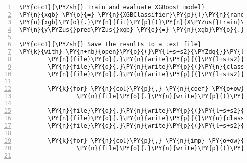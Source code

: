 \documentclass[12pt]{article}
\begin{document}
\begin{Verbatim}[commandchars=\\\{\},numbers=left,firstnumber=1,stepnumber=1,formatcom=\footnotesize]
\PY{c+c1}{\PYZsh{} Train and evaluate XGBoost model}
\PY{n}{xgb} \PY{o}{=} \PY{n}{XGBClassifier}\PY{p}{(}\PY{n}{random\PYZus{}state}\PY{o}{=}\PY{l+m+mi}{42}\PY{p}{,} \PY{n}{n\PYZus{}jobs}\PY{o}{=}\PY{o}{\PYZhy{}}\PY{l+m+mi}{1}\PY{p}{)}
\PY{n}{xgb}\PY{o}{.}\PY{n}{fit}\PY{p}{(}\PY{n}{X\PYZus{}train}\PY{p}{,} \PY{n}{y\PYZus{}train}\PY{p}{)}
\PY{n}{y\PYZus{}pred\PYZus{}xgb} \PY{o}{=} \PY{n}{xgb}\PY{o}{.}\PY{n}{predict}\PY{p}{(}\PY{n}{X\PYZus{}test}\PY{p}{)}

\PY{c+c1}{\PYZsh{} Save the results to a text file}
\PY{k}{with} \PY{n+nb}{open}\PY{p}{(}\PY{l+s+s2}{\PYZdq{}}\PY{l+s+s2}{results.txt}\PY{l+s+s2}{\PYZdq{}}\PY{p}{,} \PY{l+s+s2}{\PYZdq{}}\PY{l+s+s2}{w}\PY{l+s+s2}{\PYZdq{}}\PY{p}{)} \PY{k}{as} \PY{n}{file}\PY{p}{:}
        \PY{n}{file}\PY{o}{.}\PY{n}{write}\PY{p}{(}\PY{l+s+s2}{\PYZdq{}}\PY{l+s+s2}{Results of Logistic Regression model:}\PY{l+s+se}{\PYZbs{}n}\PY{l+s+s2}{\PYZdq{}}\PY{p}{)}
        \PY{n}{file}\PY{o}{.}\PY{n}{write}\PY{p}{(}\PY{n}{classification\PYZus{}report}\PY{p}{(}\PY{n}{y\PYZus{}test}\PY{p}{,} \PY{n}{y\PYZus{}pred\PYZus{}lr}\PY{p}{)}\PY{p}{)}
        \PY{n}{file}\PY{o}{.}\PY{n}{write}\PY{p}{(}\PY{l+s+s2}{\PYZdq{}}\PY{l+s+se}{\PYZbs{}n}\PY{l+s+s2}{Feature Importances (Logistic Regression):}\PY{l+s+se}{\PYZbs{}n}\PY{l+s+s2}{\PYZdq{}}\PY{p}{)}
    
        \PY{k}{for} \PY{n}{col}\PY{p}{,} \PY{n}{coef} \PY{o+ow}{in} \PY{n+nb}{zip}\PY{p}{(}\PY{n}{X}\PY{o}{.}\PY{n}{columns}\PY{p}{,} \PY{n}{lr}\PY{o}{.}\PY{n}{coef\PYZus{}}\PY{p}{[}\PY{l+m+mi}{0}\PY{p}{]}\PY{p}{)}\PY{p}{:}
                \PY{n}{file}\PY{o}{.}\PY{n}{write}\PY{p}{(}\PY{l+s+sa}{f}\PY{l+s+s2}{\PYZdq{}}\PY{l+s+si}{\PYZob{}}\PY{n}{col}\PY{l+s+si}{\PYZcb{}}\PY{l+s+s2}{: }\PY{l+s+si}{\PYZob{}}\PY{n}{coef}\PY{l+s+si}{\PYZcb{}}\PY{l+s+se}{\PYZbs{}n}\PY{l+s+s2}{\PYZdq{}}\PY{p}{)}
    
        \PY{n}{file}\PY{o}{.}\PY{n}{write}\PY{p}{(}\PY{l+s+s2}{\PYZdq{}}\PY{l+s+se}{\PYZbs{}n}\PY{l+s+s2}{Results of Random Forest model:}\PY{l+s+se}{\PYZbs{}n}\PY{l+s+s2}{\PYZdq{}}\PY{p}{)}
        \PY{n}{file}\PY{o}{.}\PY{n}{write}\PY{p}{(}\PY{n}{classification\PYZus{}report}\PY{p}{(}\PY{n}{y\PYZus{}test}\PY{p}{,} \PY{n}{y\PYZus{}pred\PYZus{}rf}\PY{p}{)}\PY{p}{)}
        \PY{n}{file}\PY{o}{.}\PY{n}{write}\PY{p}{(}\PY{l+s+s2}{\PYZdq{}}\PY{l+s+se}{\PYZbs{}n}\PY{l+s+s2}{Feature Importances (Random Forest):}\PY{l+s+se}{\PYZbs{}n}\PY{l+s+s2}{\PYZdq{}}\PY{p}{)}
    
        \PY{k}{for} \PY{n}{col}\PY{p}{,} \PY{n}{imp} \PY{o+ow}{in} \PY{n+nb}{zip}\PY{p}{(}\PY{n}{X}\PY{o}{.}\PY{n}{columns}\PY{p}{,} \PY{n}{rf}\PY{o}{.}\PY{n}{feature\PYZus{}importances\PYZus{}}\PY{p}{)}\PY{p}{:}
                \PY{n}{file}\PY{o}{.}\PY{n}{write}\PY{p}{(}\PY{l+s+sa}{f}\PY{l+s+s2}{\PYZdq{}}\PY{l+s+si}{\PYZob{}}\PY{n}{col}\PY{l+s+si}{\PYZcb{}}\PY{l+s+s2}{: }\PY{l+s+si}{\PYZob{}}\PY{n}{imp}\PY{l+s+si}{\PYZcb{}}\PY{l+s+se}{\PYZbs{}n}\PY{l+s+s2}{\PYZdq{}}\PY{p}{)}
    

\end{Verbatim}
\end{document}
